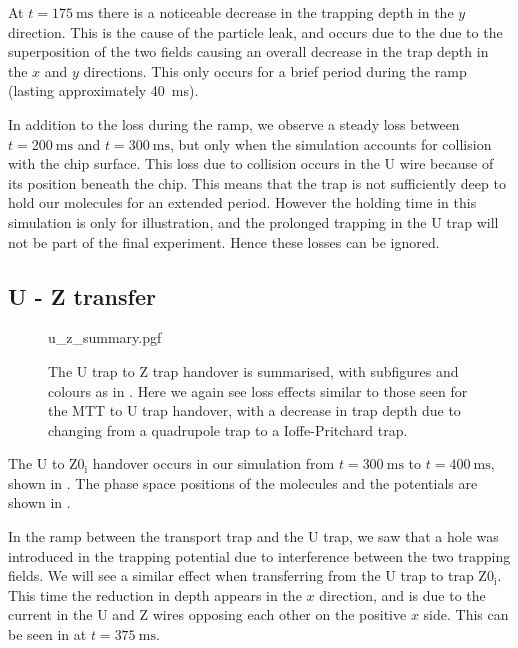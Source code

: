 At $t=\SI{175}{\milli\second}$ there is a noticeable decrease in the trapping
depth in the $y$ direction. This is the cause of the particle leak, and occurs
due to the due to the superposition of the two fields causing an overall
decrease in the trap depth in the $x$ and $y$ directions. This only occurs for
a brief period during the ramp (lasting approximately \SI{40}{\milli\second}). 

In addition to the loss during the ramp, we observe a steady loss between
$t=\SI{200}{\milli\second}$ and $t=\SI{300}{\milli\second}$, but only when the
simulation accounts for collision with the chip surface. This loss due to
collision occurs in the U wire because of its position beneath the chip. This
means that the trap is not sufficiently deep to hold our molecules for an
extended period. However the holding time in this simulation is only for
illustration, and the prolonged trapping in the U trap will not be part of the
final experiment. Hence these losses can be ignored.

\subsection{U - Z transfer}
\label{design:sim:U_to_Z0i}

\begin{figure}[p]
\centering
  {u_z_summary.pgf}
  \caption{
    The U trap to Z trap handover is summarised, with subfigures and colours as
    in . Here we again see loss effects similar
    to those seen for the MTT to U trap handover, with a decrease in trap depth
     due to changing from a quadrupole trap to a
    Ioffe-Pritchard trap.
  }
  \label{design:fig:uzsum}
\end{figure}

The U to $\mathrm{Z0_i}$ handover occurs in our simulation from
$t=\SI{300}{\milli\second}$ to $t=\SI{400}{\milli\second}$, shown in
.  The phase space positions of the
molecules and the potentials are shown in .

In the ramp between the transport trap and the U trap, we saw that a hole was
introduced in the trapping potential due to interference between the two
trapping fields. We will see a similar effect when transferring from the U trap
to trap $\mathrm{Z0_i}$.  This time the reduction in depth appears in the $x$
direction, and is due to the current in the U and Z wires opposing each other
on the positive $x$ side. This can be seen in  at
$t=\SI{375}{\milli\second}$.

